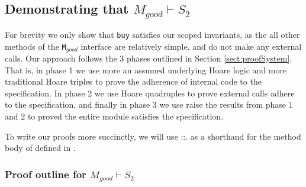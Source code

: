 \subsection{Demonstrating that $M_{good} \vdash S_2 $}
 \label{s:app:example:proofs}
 
For brevity we only show that \verb|buy| satisfies our scoped invariants, as the all other methods of 
the \verb|M|$_{good}$ interface are relatively simple, and do not make any external calls. 
Our approach follows the 3 phases outlined in Section \ref{sect:proofSystem}. That is, in
phase 1 we use more an assumed underlying Hoare logic and more traditional Hoare triples to prove the adherence of internal code to
the specification. In phase 2 we use Hoare quadruples to prove external calls adhere
to the specification, and finally in phase 3 we use raise the results from phase 1 and 2 to proved
the entire module satisfies the specification.

{ To write our proofs more succinctly, we will use ::. as a shorthand for the method body of  defined in .}

 \subsubsection{Proof outline for $M_{good} \vdash S_2$}



